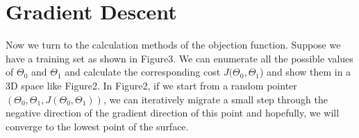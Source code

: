 \documentclass{article}
\begin{document}
\section{Gradient Descent}
Now we turn to the calculation methods of the objection function. Suppose we have a training set as shown in Figure3. We can enumerate all the possible values of $\Theta_0$ and $\Theta_1$ and calculate the corresponding cost $J(\Theta_0, \Theta_1$) and show them in a 3D space like Figure2. In Figure2, if we start from a random pointer$(\Theta_0, \Theta_1, J(\Theta_0, \Theta_1))$, we can iteratively migrate a small step through the negative direction of the gradient direction of this point and hopefully, we will converge to the lowest point of the surface.\\
\end{document}
